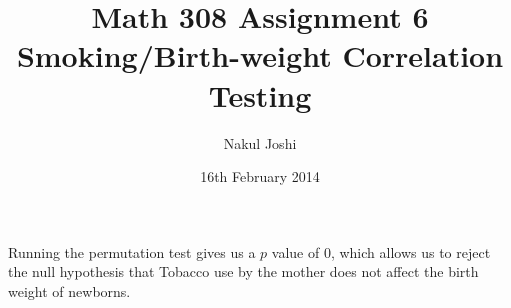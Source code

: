 \documentclass[twocolumn]{article}
\title{Math 308 Assignment 6\\Smoking/Birth-weight Correlation Testing}
\author{Nakul Joshi}
\date{16th February 2014}
\begin{document}
\maketitle
Running the permutation test gives us a $p$ value of $0$, which allows us to reject the null hypothesis that Tobacco use by the mother does not affect the birth weight of newborns.
\end{document}

